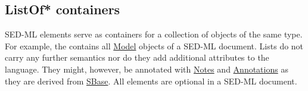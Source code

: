 \subsection{ListOf* containers}
\label{listOfElements}
SED-ML  elements serve as containers  for a collection of objects of the same type. For example, the  contains all \hyperref[class:model]{Model} objects of a SED-ML document. Lists do not carry any further semantics nor do they add additional attributes to the language. They might, however, be annotated with \hyperref[class:notes]{Notes} and \hyperref[class:annotation]{Annotations} as they are derived from \hyperref[class:sbase]{SBase}.
All  elements are optional in a SED-ML document. 

  

  

  

  

  

  

 

 


